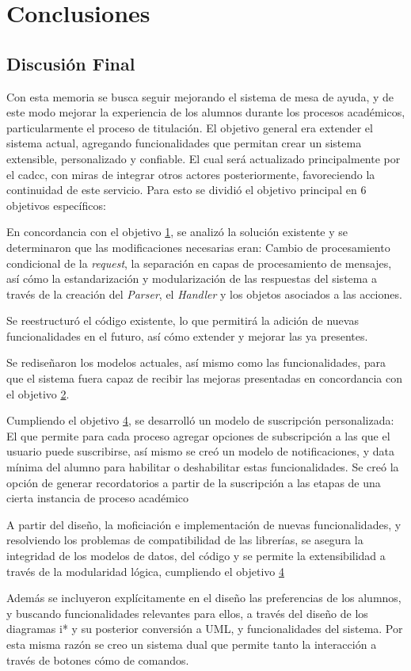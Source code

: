 \chapter{Conclusiones}
\section{Discusión Final}
\par Con esta memoria se busca seguir mejorando el sistema de mesa de ayuda, y de este modo mejorar la experiencia de los alumnos durante los procesos académicos, particularmente el proceso de titulación. El objetivo general era \guillemotleft extender el sistema actual, agregando funcionalidades que permitan crear un sistema extensible, personalizado y confiable. El cual será actualizado principalmente
por el \acrshort{cadcc}, con miras de integrar otros actores posteriormente, favoreciendo la continuidad de este servicio\guillemotright. Para esto se dividió el objetivo principal en 6 objetivos específicos:

\par En concordancia con el objetivo \href{sec:obj-e}{1}, se analizó la solución existente y se determinaron que las modificaciones necesarias eran: Cambio de procesamiento condicional de la \textit{request}, la separación en capas de procesamiento de mensajes, así cómo la estandarización y modularización de las respuestas del sistema a través de la creación del \textit{Parser}, el \textit{Handler} y los objetos asociados a las acciones.
\par Se reestructuró el código existente, lo que permitirá la adición de nuevas funcionalidades en el futuro, así cómo extender y mejorar las ya presentes.

\par Se rediseñaron los modelos actuales, así mismo como las funcionalidades, para que el sistema fuera capaz de recibir las mejoras presentadas en concordancia con el objetivo \href{sec:obj-e}{2}. 

\par  Cumpliendo el objetivo \href{sec:obj-e}{4}, se desarrolló un modelo de suscripción personalizada: El que permite para cada proceso agregar opciones de subscripción a las que el usuario puede suscribirse, así mismo se creó un modelo de notificaciones, y data mínima del alumno para habilitar o deshabilitar estas funcionalidades. Se creó la opción de generar recordatorios a partir de la suscripción a las etapas de una cierta instancia de proceso académico
\par A partir del diseño, la moficiación e implementación de nuevas funcionalidades, y resolviendo los problemas de compatibilidad de las librerías, se asegura la integridad de los modelos de datos, del código y se permite la extensibilidad a través de la modularidad lógica, cumpliendo el objetivo \href{sec:obj-e}{4}
\par Además se incluyeron explícitamente en el diseño las preferencias de los alumnos, y buscando funcionalidades relevantes para ellos, a través del diseño de los diagramas \gls{i*} y su posterior conversión a UML, y funcionalidades del sistema. Por esta misma razón se creo un sistema dual que permite tanto la interacción a través de botones cómo de comandos.

